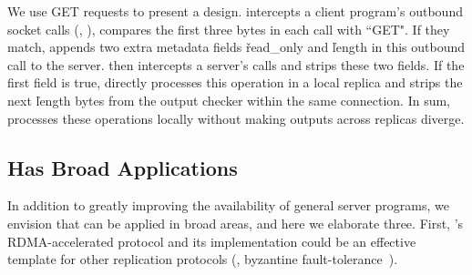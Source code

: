 We use GET requests to present a design. \xxx intercepts a client program's 
outbound socket calls (\eg, \send), compares the first three bytes in each call 
with ``GET". If they match, \xxx appends two extra \xxx metadata fields 
\v{read\_only} and \v{length} in this outbound call to the server. \xxx then 
intercepts a server's \recv calls and strips these two fields. If the first 
field is true, \xxx directly processes this operation in a local replica 
and strips the next \v{length} bytes from the output checker within the same
connection. In sum, \xxx processes these operations locally without making 
outputs across replicas diverge.








\subsection{\xxx Has Broad Applications}\label{sec:apps}

In addition to greatly improving the availability of general server programs, 
we envision that \xxx can be applied in broad areas, and here we elaborate 
three. First, \xxx's RDMA-accelerated \paxos protocol and its implementation 
could be an effective template for other replication protocols (\eg, byzantine 
fault-tolerance~\cite{zyzzyva:sosp07,pbft:osdi99}). 

